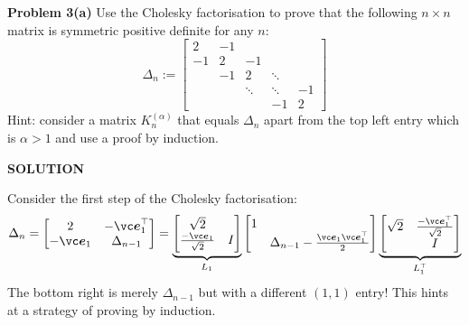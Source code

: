 \documentclass[12pt,a4paper]{article}
\def\e{ {\vc e} }
\begin{document}
\textbf{Problem 3(a)} Use the Cholesky factorisation to prove that the following $n \ensuremath{\times} n$ matrix is symmetric positive definite for any $n$:
\[
\ensuremath{\Delta}_n := \begin{bmatrix}
2 & -1 \\
-1 & 2 & -1 \\
& -1 & 2 & \ensuremath{\ddots} \\
&& \ensuremath{\ddots} & \ensuremath{\ddots} & -1 \\
&&& -1 & 2
\end{bmatrix}
\]
Hint: consider a matrix $K_n^{(\ensuremath{\alpha})}$ that equals $\ensuremath{\Delta}_n$ apart from the top left entry which is $\ensuremath{\alpha} > 1$ and use a proof by induction.

\textbf{SOLUTION}

Consider the first step of the Cholesky factorisation:
\[
\ensuremath{\Delta}_n = \begin{bmatrix} 2 & -\ensuremath{\bm{\e}}_1^\ensuremath{\top} \\
                    -\ensuremath{\bm{\e}}_1 & \ensuremath{\Delta}_{n-1} \end{bmatrix} =
                    \underbrace{\begin{bmatrix} \sqrt{2} \\
                                    {-\ensuremath{\bm{\e}}_1 \over \sqrt{2}} & I
                                        \end{bmatrix}}_{L_1}
                    \begin{bmatrix}1 \\ & \ensuremath{\Delta}_{n-1} - {\ensuremath{\bm{\e}}_1 \ensuremath{\bm{\e}}_1^\ensuremath{\top} \over 2} \end{bmatrix}
                    \underbrace{\begin{bmatrix} \sqrt{2} & {-\ensuremath{\bm{\e}}_1^\ensuremath{\top} \over \sqrt{2}} \\
                                                            & I
                                        \end{bmatrix}}_{L_1^\ensuremath{\top}}
\]
The bottom right is merely $\ensuremath{\Delta}_{n-1}$ but with a different $(1,1)$ entry! This hints at a strategy of proving by induction.
\end{document}

